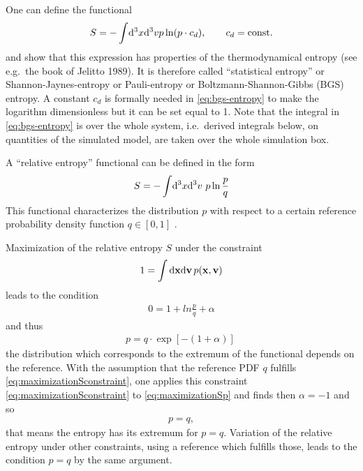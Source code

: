 One can define the functional
\begin{equation}
  \label{eq:bgs-entropy}
  S = -\int\!\mathrm{d}^3x\mathrm{d}^3v p\ln(p\cdot c_d),\qquad c_d = \mathrm{const.}
\end{equation}
and show that this expression has properties of the thermodynamical entropy (see e.g.\ the book of Jelitto 1989). It is therefore called ``statistical entropy'' or Shannon-Jaynes-entropy or Pauli-entropy or Boltzmann-Shannon-Gibbs (BGS) entropy. 
 A constant $c_d$ is formally needed in \ref{eq:bgs-entropy} to make the logarithm dimensionless \cite{DUN07} but it can be set equal to 1. Note that the integral in \ref{eq:bgs-entropy} is over the whole system, i.e.\ derived integrals below, on quantities of the simulated model, are taken over the whole simulation box. 

A ``relative entropy'' functional can be defined in the form
\begin{equation}
  \label{eq:relative-entropy}
  S = -\int\!\mathrm{d}^3x\mathrm{d}^3v\ p\ln \frac{p}{q}
\end{equation}
This functional characterizes the distribution $p$ with respect to a certain reference probability density function $q \in [0,1]$ . 


Maximization of the relative entropy $S$ under the constraint
\begin{align}\label{eq:maximizationSconstraint}
  1 = \int\mathrm{d}\mathbf{x}\mathrm{d}\mathbf{v}\,p(\mathbf{x},\mathbf{v})
\end{align}
leads to the condition
\begin{align}
  0 = 1 + ln\frac{p}{q} + \alpha
\end{align}
and thus
\begin{align}\label{eq:maximizationSp}
  p = q\cdot\exp[-(1+\alpha)]\
\end{align}
the distribution which corresponds to the extremum of the functional depends on the reference. With the assumption that the reference PDF $q$ fulfills
\ref{eq:maximizationSconstraint}, one applies this constraint \ref{eq:maximizationSconstraint} to \ref{eq:maximizationSp} and finds then $\alpha = -1$ and so
\begin{align}
  p = q ,
\end{align}
that means the entropy has its extremum for $p=q$.
Variation of the relative entropy under other constraints, using a reference which fulfills those, leads to the condition $p = q$ by the same argument.

